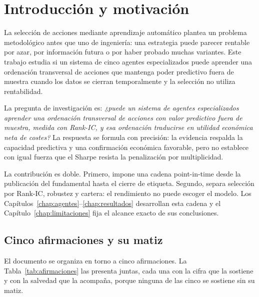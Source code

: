 \chapter{Introducción y motivación}

La selección de acciones mediante aprendizaje automático plantea un problema metodológico antes que
uno de ingeniería: una estrategia puede parecer rentable por azar, por información futura o por
haber probado muchas variantes. Este trabajo estudia si un sistema de cinco agentes especializados
puede aprender una ordenación transversal de acciones que mantenga poder predictivo fuera de muestra
cuando los datos se cierran temporalmente y la selección no utiliza rentabilidad.

La pregunta de investigación es: \emph{¿puede un sistema de agentes especializados aprender una
ordenación transversal de acciones con valor predictivo fuera de muestra, medida con Rank-IC, y esa
ordenación traducirse en utilidad económica neta de costes?} La respuesta se formula con precisión:
la evidencia respalda la capacidad predictiva y una confirmación económica favorable, pero no
establece con igual fuerza que el Sharpe resista la penalización por multiplicidad.

La contribución es doble. Primero, impone una cadena point-in-time desde la publicación del
fundamental hasta el cierre de etiqueta. Segundo, separa selección por Rank-IC, robustez y cartera:
el rendimiento no puede escoger el modelo. Los Capítulos~\ref{chap:agentes}--\ref{chap:resultados}
desarrollan esta cadena y el Capítulo~\ref{chap:limitaciones} fija el alcance exacto de sus
conclusiones.

\section*{Cinco afirmaciones y su matiz}

El documento se organiza en torno a cinco afirmaciones. La Tabla~\ref{tab:afirmaciones} las presenta
juntas, cada una con la cifra que la sostiene y con la salvedad que la acompaña, porque ninguna de
las cinco se sostiene sin su matiz.

\begin{table}[H]
  \centering
  \footnotesize
  \caption{Las cinco afirmaciones del trabajo, con su evidencia y su salvedad.}
  \label{tab:afirmaciones}
  
  \caption*{Todas las cifras proceden del estudio \studyid{} y se desarrollan en los
  Capítulos~\ref{chap:agentes} y~\ref{chap:resultados}.}
\end{table}

